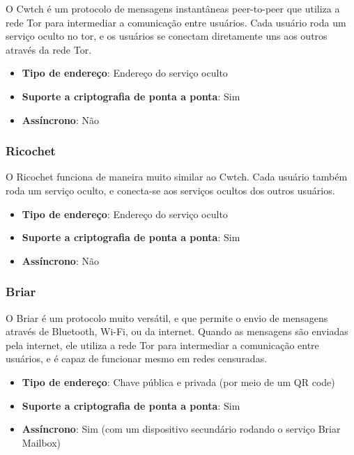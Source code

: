 O Cwtch é um protocolo de mensagens instantâneas peer-to-peer que utiliza a rede Tor para intermediar a comunicação entre usuários. Cada usuário roda um serviço oculto no tor, e os usuários se conectam diretamente uns aos outros através da rede Tor. \cite{cwtch}

\begin{itemize}
  \item \textbf{Tipo de endereço}: Endereço do serviço oculto
  \item \textbf{Suporte a criptografia de ponta a ponta}: Sim
  \item \textbf{Assíncrono}: Não
\end{itemize}

\subsubsection{Ricochet}

O Ricochet funciona de maneira muito similar ao Cwtch. Cada usuário também roda um serviço oculto, e conecta-se aos serviços ocultos dos outros usuários. \cite{ricochet}

\begin{itemize}
  \item \textbf{Tipo de endereço}: Endereço do serviço oculto
  \item \textbf{Suporte a criptografia de ponta a ponta}: Sim
  \item \textbf{Assíncrono}: Não
\end{itemize}

\subsubsection{Briar}

O Briar é um protocolo muito versátil, e que permite o envio de mensagens através de Bluetooth, Wi-Fi, ou da internet. Quando as mensagens são enviadas pela internet, ele utiliza a rede Tor para intermediar a comunicação entre usuários, e é capaz de funcionar mesmo em redes censuradas. \cite{briar}

\begin{itemize}
  \item \textbf{Tipo de endereço}: Chave pública e privada (por meio de um QR code)
  \item \textbf{Suporte a criptografia de ponta a ponta}: Sim
  \item \textbf{Assíncrono}: Sim (com um dispositivo secundário rodando o serviço Briar Mailbox)
\end{itemize}

